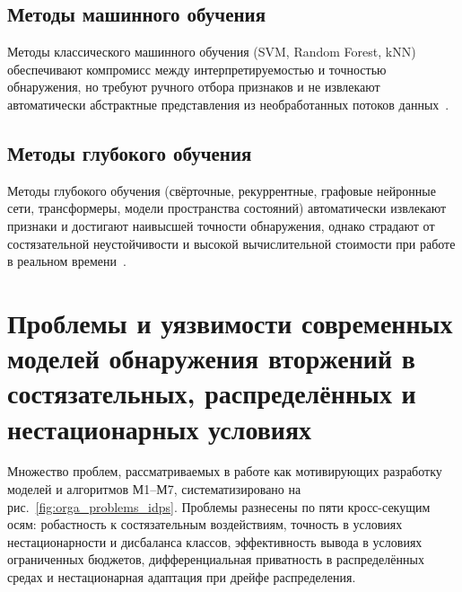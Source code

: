 \subsection{Методы машинного обучения}

Методы классического машинного обучения (SVM, Random Forest, kNN)
обеспечивают компромисс между интерпретируемостью и точностью
обнаружения, но требуют ручного отбора признаков и не извлекают
автоматически абстрактные представления из необработанных потоков
данных~\cite{Buczak2016}.

\subsection{Методы глубокого обучения}

Методы глубокого обучения (свёрточные, рекуррентные, графовые нейронные
сети, трансформеры, модели пространства состояний) автоматически
извлекают признаки и достигают наивысшей точности обнаружения, однако
страдают от состязательной неустойчивости и высокой вычислительной
стоимости при работе в реальном времени~\cite{Ahmad2021,Ferrag2020}.

\section{Проблемы и уязвимости современных моделей обнаружения вторжений в состязательных, распределённых и нестационарных условиях}
\label{sec:idps_problems}

Множество проблем, рассматриваемых в работе как мотивирующих
разработку моделей и алгоритмов М1--М7, систематизировано на
рис.~\ref{fig:orga_problems_idps}. Проблемы разнесены по пяти
кросс-секущим осям: робастность к состязательным воздействиям,
точность в условиях нестационарности и дисбаланса классов,
эффективность вывода в условиях ограниченных бюджетов,
дифференциальная приватность в распределённых средах и нестационарная
адаптация при дрейфе распределения.

